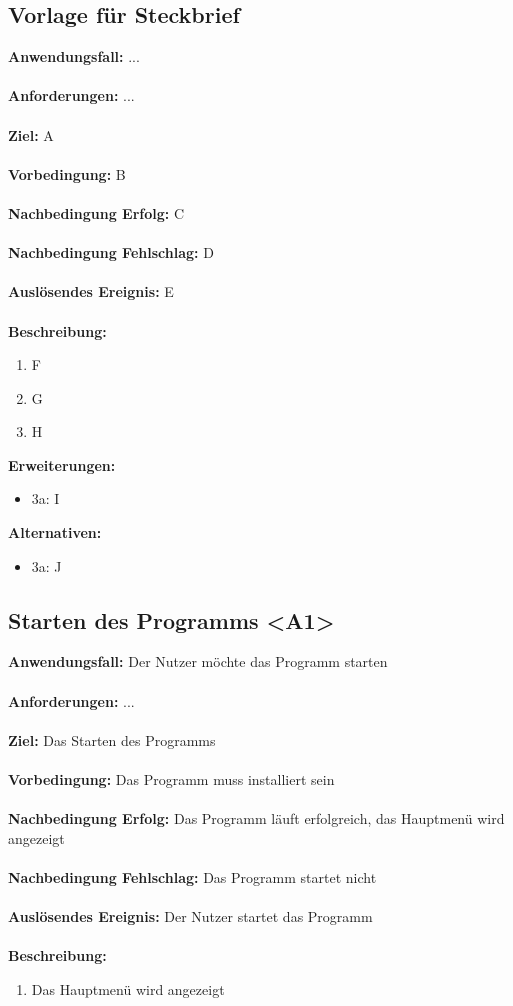 \documentclass[parskip=full]{scrartcl} %
\begin{document}
\subsection*{Vorlage für Steckbrief}
\textbf{Anwendungsfall:} ...\\\\
\textbf{Anforderungen:} ...\\\\
\textbf{Ziel:} A \\\\
\textbf{Vorbedingung:} B \\\\
\textbf{Nachbedingung Erfolg:} C \\\\
\textbf{Nachbedingung Fehlschlag:} D \\\\
\textbf{Auslösendes Ereignis:} E \\\\
\textbf{Beschreibung:}
\begin{enumerate}
    \item F
    \item G
    \item H
\end{enumerate}
\textbf{Erweiterungen:} 
\begin{itemize}
    \item 3a: I
\end{itemize}
\textbf{Alternativen:} 
\begin{itemize}
    \item 3a: J
\end{itemize}
\newpage


\subsection*{Starten des Programms <A1>}
\textbf{Anwendungsfall:}  Der Nutzer möchte das Programm starten\\\\
\textbf{Anforderungen:} ...\\\\
\textbf{Ziel:} Das Starten des Programms \\\\
\textbf{Vorbedingung:} Das Programm muss installiert sein  \\\\
\textbf{Nachbedingung Erfolg:} Das Programm läuft erfolgreich, das Hauptmenü wird angezeigt\\\\
\textbf{Nachbedingung Fehlschlag:} Das Programm startet nicht \\\\
\textbf{Auslösendes Ereignis:} Der Nutzer startet das Programm \\\\
\textbf{Beschreibung:}
\begin{enumerate}
    \item Das Hauptmenü wird angezeigt
\end{enumerate}
\newpage
\end{document}
